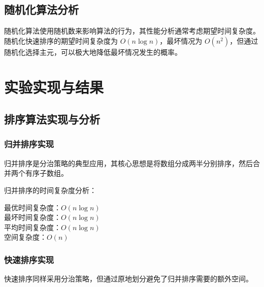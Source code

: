 \documentclass[12pt,a4paper,UTF8]{article}
\newenvironment{algorithm复杂度}{
    \begin{trivlist}\item[\textbf{算法复杂度：}]
}{\end{trivlist}}
\begin{document}
\subsection{随机化算法分析}

随机化算法使用随机数来影响算法的行为，其性能分析通常考虑期望时间复杂度。随机化快速排序的期望时间复杂度为 $O(n \log n)$，最坏情况为 $O(n^2)$，但通过随机化选择主元，可以极大地降低最坏情况发生的概率。

\newpage
\section{实验实现与结果}

\subsection{排序算法实现与分析}

\subsubsection{归并排序实现}

归并排序是分治策略的典型应用，其核心思想是将数组分成两半分别排序，然后合并两个有序子数组。



归并排序的时间复杂度分析：
\begin{algorithm复杂度}
    最优时间复杂度：$O(n \log n)$ \\
    最坏时间复杂度：$O(n \log n)$ \\
    平均时间复杂度：$O(n \log n)$ \\
    空间复杂度：$O(n)$
\end{algorithm复杂度}



\subsubsection{快速排序实现}

快速排序同样采用分治策略，但通过原地划分避免了归并排序需要的额外空间。


\end{document}
